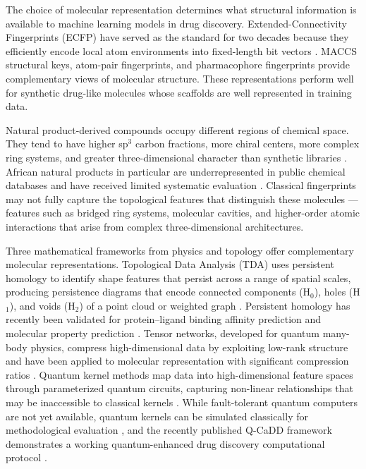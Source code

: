 \documentclass[11pt,a4paper]{article}
\begin{document}
The choice of molecular representation determines what structural information is available to machine learning models in drug discovery. Extended-Connectivity Fingerprints (ECFP) have served as the standard for two decades because they efficiently encode local atom environments into fixed-length bit vectors \citep{ecfp_2010}. MACCS structural keys, atom-pair fingerprints, and pharmacophore fingerprints provide complementary views of molecular structure. These representations perform well for synthetic drug-like molecules whose scaffolds are well represented in training data.

Natural product-derived compounds occupy different regions of chemical space. They tend to have higher sp$^3$ carbon fractions, more chiral centers, more complex ring systems, and greater three-dimensional character than synthetic libraries \citep{coconut_2021}. African natural products in particular are underrepresented in public chemical databases and have received limited systematic evaluation \citep{anpdb_2026,value_addition_african_np_2025}. Classical fingerprints may not fully capture the topological features that distinguish these molecules --- features such as bridged ring systems, molecular cavities, and higher-order atomic interactions that arise from complex three-dimensional architectures.

Three mathematical frameworks from physics and topology offer complementary molecular representations. Topological Data Analysis (TDA) uses persistent homology to identify shape features that persist across a range of spatial scales, producing persistence diagrams that encode connected components (H$_0$), holes (H$_1$), and voids (H$_2$) of a point cloud or weighted graph \citep{tda_review_2025}. Persistent homology has recently been validated for protein--ligand binding affinity prediction \citep{tda_binding_affinity_2026} and molecular property prediction \citep{tda_pretraining_2026}. Tensor networks, developed for quantum many-body physics, compress high-dimensional data by exploiting low-rank structure and have been applied to molecular representation with significant compression ratios \citep{tensornet_2023,tn_efficient_2026}. Quantum kernel methods map data into high-dimensional feature spaces through parameterized quantum circuits, capturing non-linear relationships that may be inaccessible to classical kernels \citep{qml_review_2026}. While fault-tolerant quantum computers are not yet available, quantum kernels can be simulated classically for methodological evaluation \citep{pqc_chemistry_2026}, and the recently published Q-CaDD framework demonstrates a working quantum-enhanced drug discovery computational protocol \citep{q_cadd_2026}.
\end{document}

